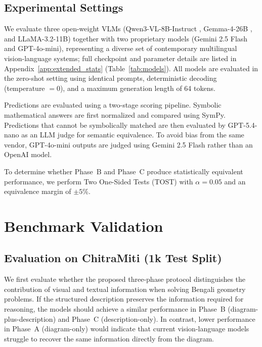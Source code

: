 \documentclass[11pt]{article}
\begin{document}
\subsection{Experimental Settings}
\label{ssec:models}

We evaluate three open-weight VLMs (Qwen3-VL-8B-Instruct \citep{bai2025qwen3}, Gemma-4-26B \citep{team2026gemma}, and LLaMA-3.2-11B) together with two proprietary models (Gemini 2.5 Flash and GPT-4o-mini), representing a diverse set of contemporary multilingual vision-language systems; full checkpoint and parameter details are listed in Appendix~\ref{app:extended_stats} (Table~\ref{tab:models}). All models are evaluated in the zero-shot setting using identical prompts, deterministic decoding (temperature $=0$), and a maximum generation length of 64 tokens.

Predictions are evaluated using a two-stage scoring pipeline. Symbolic mathematical answers are first normalized and compared using SymPy. Predictions that cannot be symbolically matched are then evaluated by GPT-5.4-nano \citep{openai2026gpt54nano} as an LLM judge for semantic equivalence. To avoid bias from the same vendor, GPT-4o-mini outputs are judged using Gemini 2.5 Flash rather than an OpenAI model.

To determine whether Phase~B and Phase~C produce statistically equivalent performance, we perform Two One-Sided Tests (TOST) with $\alpha=0.05$ and an equivalence margin of $\pm5$\%.

\section{Benchmark Validation}
\label{sec:results}

\subsection{Evaluation on ChitraMiti (1k Test Split)}
\label{ssec:chitramiti_results}

We first evaluate whether the proposed three-phase protocol distinguishes the contribution of visual and textual information when solving Bengali geometry problems. If the structured description preserves the information required for reasoning, the models should achieve a similar performance in Phase~B (diagram-plus-description) and Phase~C (description-only). In contrast, lower performance in Phase~A (diagram-only) would indicate that current vision-language models struggle to recover the same information directly from the diagram.
\end{document}
